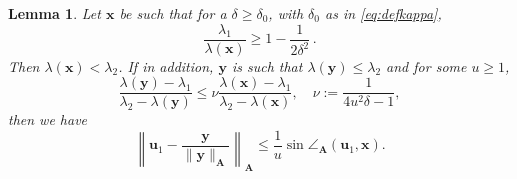 \documentclass[a4paper,11pt,oneside]{amsart}
\newtheorem{lemma}[theorem]{Lemma}
\theoremstyle{definition}
\theoremstyle{remark}
\newcommand{\A}{\ten A}
\newcommand{\ten}[1]{\boldsymbol{#1}}
\numberwithin{equation}{section}
\numberwithin{theorem}{section}
\begin{document}
\begin{lemma}\label{rankoptaprior}
Let $\ten x$ be such that for a $\delta \geq \delta_0$, with $\delta_0$ as in \eqref{eq:defkappa},
\begin{equation}\label{assrankopt}
%
 \frac{\lambda_1}{\lambda(\ten x)} \geq 1 - \frac{1}{2 \delta^2}    \,.
\end{equation}
%
%
%
Then $\lambda(\ten x) < \lambda_2$. If in addition, $\ten y$ is such that $\lambda(\ten y) \leq \lambda_2$ and for some $u \geq 1$,
\begin{equation}\label{actualineq}
 \frac{\lambda(\ten y) - \lambda_1}{\lambda_2 - \lambda(\ten y)} \leq \nu  \frac{\lambda(\ten{x}) - \lambda_1}{\lambda_2 - \lambda(\ten{x})} , \quad \nu := \frac{1}{4 u^2 \delta  - 1},
\end{equation} 
 then we have
 \begin{equation}\label{eq:normubound}
  \left\| \ten u_1 - \frac{\ten y}{\|\ten y\|_{\A}} \right\|_{\A} \leq \frac{1}{u} \sin \angle_{\A}(\ten u_1,\ten x).
\end{equation}
\end{lemma}
\end{document}
